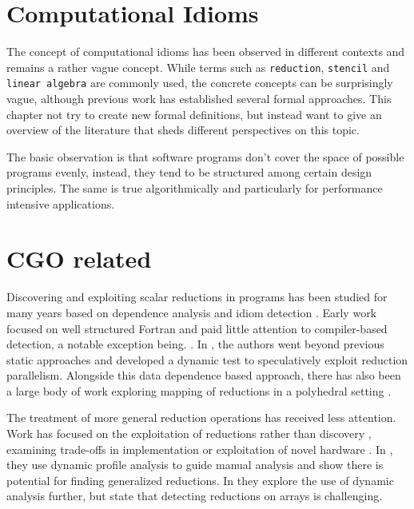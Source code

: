 \section{Computational Idioms}

    The concept of computational idioms has been observed in different contexts
    and remains a rather vague concept.
    While terms such as \texttt{reduction}, \texttt{stencil} and
    \texttt{linear algebra} are commonly used, the concrete concepts can be
    surprisingly vague, although previous work has established several formal
    approaches.
    This chapter not try to create new formal definitions, but instead want to
    give an overview of the literature that sheds different perspectives on this
    topic.

    The basic observation is that software programs don't cover the space of
    possible programs evenly, instead, they tend to be structured among certain
    design principles.
    The same is true algorithmically and particularly for performance intensive
    applications.

\section{CGO related}

    Discovering and exploiting scalar reductions in programs has been studied
    for many years based on dependence analysis and idiom detection
    \cite{pottenger1995idiom,suganuma1996detection,fisher1994parallelizing}.
    Early work focused on well structured Fortran and paid little attention to
    compiler-based detection, a notable exception being. 
    \cite{suganuma1996detection}. 
    In \cite{rauchwerger1999lrpd}, the authors went beyond previous static
    approaches and developed a dynamic test to speculatively exploit reduction
    parallelism.
    Alongside this data dependence based approach, there has also been a
    large body of work exploring mapping of reductions in a polyhedral setting
    \cite{redon1994scheduling, jouvelot1989unified}.

    The treatment of more general reduction operations has received less
    attention.
    Work has focused on the exploitation of reductions rather than discovery
    \cite{gutierrez2003optimization,gutierrez2008analytical, Gutierrez:2000},
    examining trade-offs in implementation \cite{yu2006adaptive} or exploitation
    of novel hardware \cite{ravi2010compiler,Huo2011HiPC}.
    In \cite{das2010experiences}, they use dynamic profile analysis to guide
    manual analysis and show there is potential for finding generalized
    reductions.
    In \cite{kim2012dynamic} they explore the use of dynamic analysis further,
    but state that detecting reductions on arrays is challenging.

